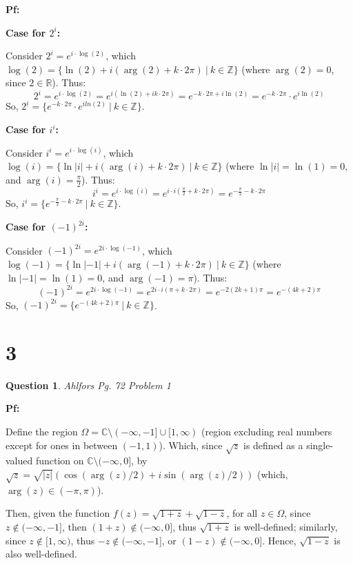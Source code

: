 \documentclass{article}
\newtheorem{question}{Question}
\begin{document}
\textbf{Pf:}

\textbf{Case for $2^i$:}

Consider $2^i = e^{i\cdot \log(2)}$, which $\log(2) = \{\ln(2) + i(\arg(2)+k\cdot 2\pi)\ |\ k\in\mathbb{Z}\}$ (where $\arg(2)=0$, since $2\in \mathbb{R}$). 
Thus:
$$2^i=e^{i\cdot \log(2)} = e^{i(\ln(2)+ik\cdot 2\pi)} = e^{-k\cdot 2\pi + i\ln(2)} = e^{-k\cdot 2\pi}\cdot e^{i\ln(2)}$$
So, $2^i = \{e^{-k\cdot 2\pi} \cdot e^{iln(2)}\ |\ k\in\mathbb{Z}\}$.

\hfill

\textbf{Case for $i^i$:}

Consider $i^i = e^{i\cdot \log(i)}$, which $\log(i)=\{\ln|i|+i(\arg(i)+k\cdot 2\pi)\ |\ k\in\mathbb{Z}\}$ (where $\ln|i| = \ln(1)=0$, and $\arg(i)=\frac{\pi}{2}$).
Thus:
$$i^i=e^{i\cdot \log(i)} = e^{i\cdot i(\frac{\pi}{2}+k\cdot 2\pi)} = e^{-\frac{\pi}{2}-k\cdot 2\pi}$$
So, $i^i = \{e^{-\frac{\pi}{2}-k\cdot 2\pi}\ |\ k\in\mathbb{Z}\}$.

\hfill

\textbf{Case for $(-1)^{2i}$:}

Consider $(-1)^{2i} = e^{2i\cdot \log(-1)}$, which $\log(-1)=\{\ln|-1|+i(\arg(-1)+k\cdot 2\pi)\ |\ k\in\mathbb{Z}\}$ (where $\ln|-1|=\ln(1)=0$, and $\arg(-1)=\pi$). 
Thus:
$$(-1)^{2i}=e^{2i\cdot \log(-1)}=e^{2i\cdot i(\pi+k\cdot 2\pi)} = e^{-2(2k+1)\pi} = e^{-(4k+2)\pi}$$
So, $(-1)^{2i}=\{e^{-(4k+2)\pi}\ |\ k\in\mathbb{Z}\}$.

\hfill

\hfill

\section*{3}
\begin{myBox}[]{}
    \begin{question}
        Ahlfors Pg. 72 Problem 1
    \end{question}
\end{myBox}

\textbf{Pf:}

Define the region $\Omega = \mathbb{C}\setminus(-\infty,-1]\cup [1,\infty)$ (region excluding real numbers except for ones in between $(-1,1)$).
Which, since $\sqrt{z}$ is defined as a single-valued function on $\mathbb{C}\setminus(-\infty,0]$, by 
$\sqrt{z} = \sqrt{|z|}(\cos(\arg(z)/2)+i\sin(\arg(z)/2))$ (which, $\arg(z)\in (-\pi,\pi)$). 

\hfill

Then, given the function $f(z)=\sqrt{1+z}+\sqrt{1-z}$, for all $z\in \Omega$, since $z\notin (-\infty,-1]$, then $(1+z)\notin (-\infty, 0]$, thus $\sqrt{1+z}$ is well-defined;
similarly, since $z\notin [1,\infty)$, thus $-z \notin (-\infty,-1]$, or $(1-z)\notin (-\infty,0]$. Hence, $\sqrt{1-z}$ is also well-defined.
\end{document}
